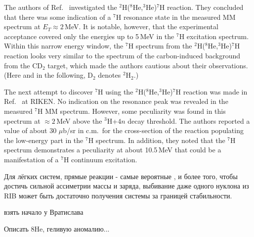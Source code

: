 \newpage

The authors of Ref.\ \cite{Fortier:2007} investigated the $^2$H($^8$He,$^3$He)$^7$H reaction.
They concluded that there was some indication of a $^7$H resonance state in the measured MM spectrum at $E_T \approx 2$\,MeV.
It is notable, however, that the experimental acceptance covered only the energies up to 5\,MeV in the $^{7}$H excitation spectrum.
Within this narrow energy window, the $^{7}$H spectrum from the $^2$H($^8$He,$^3$He)$^7$H reaction looks very similar to the spectrum of the  carbon-induced background from the CD$_2$ target, which made the authors cautious about their observations. (Here and in the following, D$_2$ denotes
$^2$H$_2$.)

The next attempt to discover $^{7}$H  using the $^2$H($^8$He,$^3$He)$^7$H reaction was made in Ref.\ \cite{Nikolskii:2010} at RIKEN.
No indication on the resonance peak was revealed in the measured $^7$H MM spectrum.
However, some peculiarity was found in this spectrum at $\approx 2$\,MeV above the $^3$H+$4n$ decay threshold.
The authors reported a value of about 30 $\mu$b/sr in c.m.\ for the cross-section of the reaction populating the low-energy part in the $^7$H spectrum.
In addition, they noted that the $^7$H spectrum demonstrates a peculiarity at about 10.5\,MeV that could be a manifestation of a $^{7}$H continuum excitation.

Для лёгких систем, прямые реакции - самые вероятные , и более того, чтобы достичь сильной ассиметрии массы и заряда, выбивание даже одного нуклона из RIB может быть достаточно получения системы за границей стабильности.

взять начало у Вратислава

Описать 8He, геливую аномалию...